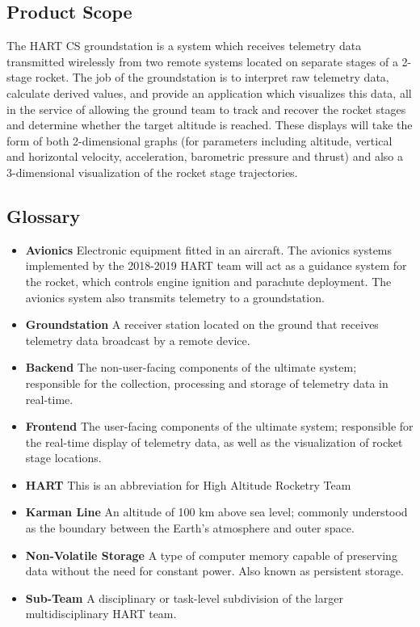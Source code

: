 \documentclass[onecolumn, draftclsnofoot,10pt, compsoc]{IEEEtran}
\begin{document}
		\subsection{Product Scope}
			The HART CS groundstation is a system which receives telemetry data transmitted wirelessly from two remote systems located on separate stages of a 2-stage rocket. 
			The job of the groundstation is to interpret raw telemetry data, calculate derived values, and provide an application which visualizes this data, all in the service of allowing the ground team to track and recover the rocket stages and determine whether the target altitude is reached.
			These displays will take the form of both 2-dimensional graphs (for parameters including altitude, vertical and horizontal velocity, acceleration, barometric pressure and thrust) and also a 3-dimensional visualization of the rocket stage trajectories.

		\subsection{Glossary}
			\begin{itemize}
				\item \textbf{Avionics}
					Electronic equipment fitted in an aircraft.
					The avionics systems implemented by the 2018-2019 HART team will act as a guidance system for the rocket, which controls engine ignition and parachute deployment.
					The avionics system also transmits telemetry to a groundstation.
				\item \textbf{Groundstation}
					A receiver station located on the ground that receives telemetry data broadcast by a remote device.
				\item \textbf{Backend}
					The non-user-facing components of the ultimate system; responsible for the collection, processing and storage of telemetry data in real-time.
				\item \textbf{Frontend}
					The user-facing components of the ultimate system; responsible for the real-time display of telemetry data, as well as the visualization of rocket stage locations.
				\item \textbf{HART}
					This is an abbreviation for High Altitude Rocketry Team
				\item \textbf{Karman Line}
					An altitude of 100 km above sea level; commonly understood as the boundary between the Earth's atmosphere and outer space.
				\item \textbf{Non-Volatile Storage}
					A type of computer memory capable of preserving data without the need for constant power. Also known as persistent storage.
				\item \textbf{Sub-Team}
					A disciplinary or task-level subdivision of the larger multidisciplinary HART team.

			\end{itemize}
\end{document}
